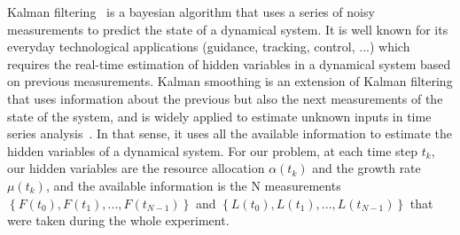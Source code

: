 Kalman filtering~\cite{kalman_new_1960} is a bayesian algorithm that uses a series of noisy measurements to predict the state of a dynamical system.
It is well known for its everyday technological applications (guidance, tracking, control, ...) which requires the real-time estimation of hidden variables in a dynamical system based on previous measurements.
Kalman smoothing is an extension of Kalman filtering that uses information about the previous but also the next measurements of the state of the system, and is widely applied to estimate unknown inputs in time series analysis~\cite{kailath_linear_2000,jazwinski_stochastic_2007}.
In that sense, it uses all the available information to estimate the hidden variables of a dynamical system.
For our problem, at each time step $t_k$, our hidden variables are the resource allocation $\alpha (t_k)$ and the growth rate $\mu (t_k)$, and the available information is the N measurements $\left\{ F(t_0), F(t_1), ..., F(t_{N-1}) \right\}$ and $\left\{L(t_0), L(t_1), ..., L(t_{N-1}) \right\}$ that were taken during the whole experiment.

